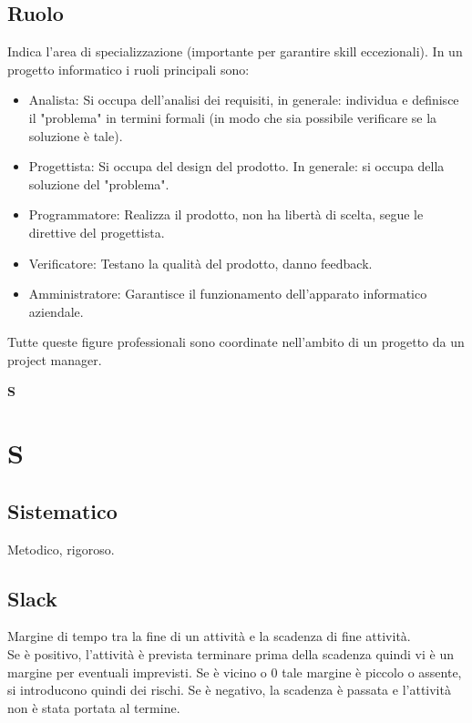 	\subsection{Ruolo}
	\label{sec:ruolo}
	Indica l'area di specializzazione (importante per garantire skill eccezionali).
	In un progetto informatico i ruoli principali sono:
	\begin{itemize}  
	\item Analista: Si occupa dell'analisi dei requisiti, in generale: individua e definisce il "problema" in termini formali (in modo che sia possibile verificare se la soluzione è tale). 
	\item Progettista: Si occupa del design del prodotto. In generale: si occupa della soluzione del "problema".
	\item Programmatore: Realizza il prodotto, non ha libertà di scelta, segue le direttive del progettista.
	\item Verificatore: Testano la qualità del prodotto, danno feedback.
	\item Amministratore: Garantisce il funzionamento dell'apparato informatico aziendale. 
	\end{itemize}
	Tutte queste figure professionali sono coordinate nell'ambito di un progetto da un project manager.
	\newpage
	
	{\Huge{\textbf{S}}} \\
	\section{S}
	
	\subsection{Sistematico}
	\label{sec:sistematico}
	Metodico, rigoroso.

	\subsection{Slack}
	\label{sec:slack}
	Margine di tempo tra la fine di un attività e la scadenza di fine attività. \\
	Se è positivo, l'attività è prevista terminare prima della scadenza quindi vi è un margine per eventuali imprevisti. Se è vicino o 0 tale margine è piccolo o assente, si introducono quindi dei rischi. Se è negativo, la scadenza è passata e l'attività non è stata portata al termine.
	
